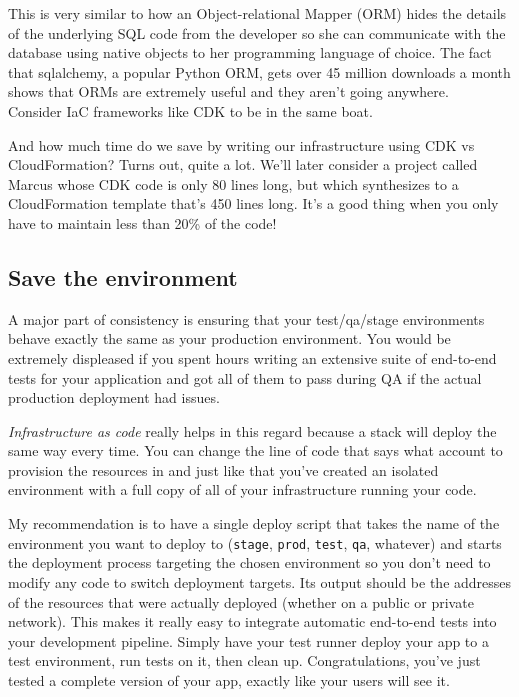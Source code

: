 \documentclass{article}
\newcommand{\noterm}[1]{\textit{#1}}
\newcommand{\term}[1]{\noterm{#1}\index{#1}}
\begin{document}
This is very similar to how an Object-relational Mapper (ORM) hides the details of the underlying SQL code from the developer so she can communicate with the database using native objects to her programming language of choice.
The fact that sqlalchemy, a popular Python ORM, gets over 45 million downloads a month shows that ORMs are extremely useful and they aren't going anywhere.~\cite{sqlalchemy-stats}
Consider IaC frameworks like CDK to be in the same boat.

And how much time do we save by writing our infrastructure using CDK vs CloudFormation?
Turns out, quite a lot.
We'll later consider a project called Marcus whose CDK code is only 80 lines long, but which synthesizes to a CloudFormation template that's 450 lines long.
It's a good thing when you only have to maintain less than 20\% of the code!

\subsection{Save the environment}

A major part of consistency is ensuring that your test/qa/stage environments behave exactly the same as your production environment.
You would be extremely displeased if you spent hours writing an extensive suite of end-to-end tests for your application and got all of them to pass during QA if the actual production deployment had issues.

\term{Infrastructure as code} really helps in this regard because a stack will deploy the same way every time.
You can change the line of code that says what account to provision the resources in and just like that you've created an isolated environment with a full copy of all of your infrastructure running your code.

My recommendation is to have a single deploy script that takes the name of the environment you want to deploy to (\texttt{stage}, \texttt{prod}, \texttt{test}, \texttt{qa}, whatever) and starts the deployment process targeting the chosen environment so you don't need to modify any code to switch deployment targets.
Its output should be the addresses of the resources that were actually deployed (whether on a public or private network).
This makes it really easy to integrate automatic end-to-end tests into your development pipeline.
Simply have your test runner deploy your app to a test environment, run tests on it, then clean up.
Congratulations, you've just tested a complete version of your app, exactly like your users will see it.
\end{document}
